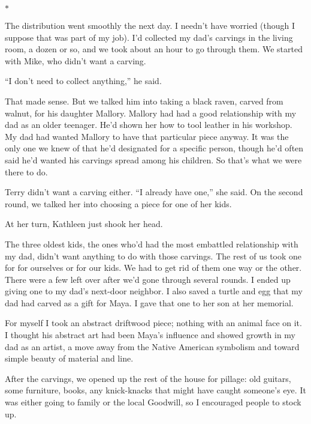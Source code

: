 \documentclass[12pt]{book}
\begin{document}
\begin{center}$*$\end{center}

The distribution went smoothly the next day. I needn't have worried (though I suppose that was part of my job). I'd collected my dad's carvings in the living room, a dozen or so, and we took about an hour to go through them. We started with Mike, who didn't want a carving.

``I don't need to collect anything,'' he said.

That made sense. But we talked him into taking a black raven, carved from walnut, for his daughter Mallory. Mallory had had a good relationship with my dad as an older teenager. He'd shown her how to tool leather in his workshop. My dad had wanted Mallory to have that particular piece anyway. It was the only one we knew of that he'd designated for a specific person, though he'd often said he'd wanted his carvings spread among his children. So that's what we were there to do.

Terry didn't want a carving either. ``I already have one,'' she said. On the second round, we talked her into choosing a piece for one of her kids.

At her turn, Kathleen just shook her head.

The three oldest kids, the ones who'd had the most embattled relationship with my dad, didn't want anything to do with those carvings. The rest of us took one for for ourselves or for our kids. We had to get rid of them one way or the other. There were a few left over after we'd gone through several rounds. I ended up giving one to my dad's next-door neighbor. I also saved a turtle and egg that my dad had carved as a gift for Maya. I gave that one to her son at her memorial.

For myself I took an abstract driftwood piece; nothing with an animal face on it. I thought his abstract art had been Maya's influence and showed growth in my dad as an artist, a move away from the Native American symbolism and toward simple beauty of material and line.

After the carvings, we opened up the rest of the house for pillage: old guitars, some furniture, books, any knick-knacks that might have caught someone's eye. It was either going to family or the local Goodwill, so I encouraged people to stock up.
\end{document}
